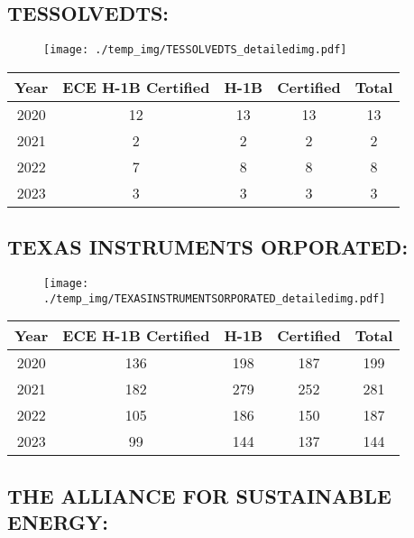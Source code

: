 \documentclass{article}%
\begin{document}
%
\newpage%
\subsection{TESSOLVEDTS:}%
\label{subsec:TESSOLVEDTS}%
\label{TESSOLVEDTSdetailed}%


\begin{figure}[htbp]%
\centering%
\texttt{[image: ./temp\_img/TESSOLVEDTS\_detailedimg.pdf]}%
\end{figure}

%
\begin{longtable}{c|c|c|c|c}%
\hline%
Year&ECE H{-}1B Certified&H{-}1B&Certified&Total\\%
\hline%
2020&12&13&13&13\\%
\hline%
2021&2&2&2&2\\%
\hline%
2022&7&8&8&8\\%
\hline%
2023&3&3&3&3\\%
\hline%
\end{longtable}

%
\newpage%
\subsection{TEXAS INSTRUMENTS ORPORATED:}%
\label{subsec:TEXASINSTRUMENTSORPORATED}%
\label{TEXASINSTRUMENTSORPORATEDdetailed}%


\begin{figure}[htbp]%
\centering%
\texttt{[image: ./temp\_img/TEXASINSTRUMENTSORPORATED\_detailedimg.pdf]}%
\end{figure}

%
\begin{longtable}{c|c|c|c|c}%
\hline%
Year&ECE H{-}1B Certified&H{-}1B&Certified&Total\\%
\hline%
2020&136&198&187&199\\%
\hline%
2021&182&279&252&281\\%
\hline%
2022&105&186&150&187\\%
\hline%
2023&99&144&137&144\\%
\hline%
\end{longtable}

%
\newpage%
\subsection{THE ALLIANCE FOR SUSTAINABLE ENERGY:}%
\label{subsec:THEALLIANCEFORSUSTAINABLEENERGY}%
\label{THEALLIANCEFORSUSTAINABLEENERGYdetailed}%
\end{document}
